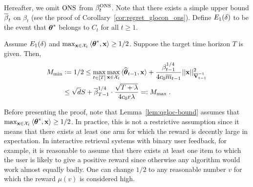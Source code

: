 Hereafter, we omit ${\text{\normalfont ONS}}$ from $\beta^{\text{\normalfont ONS}}_t$.
Note that there exists a simple upper bound ${\overline{\beta}}_t$ on $\beta_t$ (see the proof of Corollary~\ref{cor:regret_glocon_ons}). 
Define $E_1({\delta})$ to be the event that ${{\boldsymbol \theta}}^*$ belongs to $C_t$ for all $t\ge1$.
%
\vspace{-3pt}
\begin{lem}\label{lem:qgloc-bound} 
  Assume $E_1({\delta})$ and $\max_{\mathbf{x} \in \mathcal{X}_t}{\langle} {{\boldsymbol \theta}}^*, \mathbf{x} {\rangle} \ge 1/2$.
  Suppose the target time horizon $T$ is given.
  Then,
  \vspace{-4pt}
  \begin{equation*}\begin{aligned}
    M_{\min} 
    &:= 1/2 
      \le \max_{t\in[T]} \max_{\mathbf{x}\in\mathcal{X}_t} {\langle}\widehat{\boldsymbol\theta}_{t-1}, \mathbf{x}{\rangle} + { \frac{\beta_{t-1}^{1/4}}{4 c_0 \overline{m}_{t-1}} } ||\mathbf{x}||^2_{\overline{\mathbf{V}}^{-1}_{t-1}} \\
    & \le \sqrt{d}S + {\overline{\beta}}_{T-1}^{1/4}\cdot { \frac{\sqrt{T+{\ensuremath{\lambda}} }}{4c_0 r {\ensuremath{\lambda}} } }
      =: M_{\max} \;.
  \end{aligned}\end{equation*}
\end{lem}
\vspace{-4pt}
Before presenting the proof, note that Lemma~\ref{lem:qgloc-bound} assumes that $\max_{\mathbf{x} \in \mathcal{X}_t}{\langle} {{\boldsymbol \theta}}^*, \mathbf{x} {\rangle} \ge 1/2$. 
In practice, this is not a restrictive assumption since it means that there exists at least one arm for which the reward is decently large in expectation. %
In interactive retrieval systems with binary user feedback, for example, it is reasonable to assume that there exists at least one item to which the user is likely to give a positive reward since otherwise any algorithm would work almost equally badly.
One can change $1/2$ to any reasonable number $v$ for which the reward $\mu(v)$ is considered high. %
%
